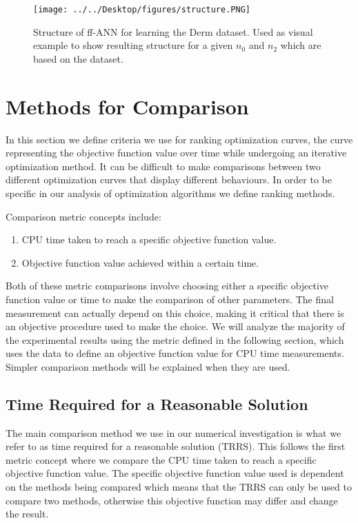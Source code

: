 \documentclass[letterpaper,12pt,titlepage,oneside,final]{book}
\begin{document}
	
	\begin{figure}[h]
		\centering
		\texttt{[image: ../../Desktop/figures/structure.PNG]}
		\caption{Structure of ff-ANN for learning the Derm dataset. Used as visual example to show resulting structure for a given $n_{0}$ and $n_{2}$ which are based on the dataset.}
		\label{figure:structure}
	\end{figure}

	
	\section{Methods for Comparison}
	
	In this section we define criteria we use for ranking optimization curves, the curve representing the objective function value over time while undergoing an iterative optimization method. It can be difficult to make comparisons between two different optimization curves that display different behaviours. In order to be specific in our analysis of optimization algorithms we define ranking methods. 
	
	Comparison metric concepts include:
	\begin{enumerate}
		\item CPU time taken to reach a specific objective function value.
		\item Objective function value achieved within a certain time.
	\end{enumerate}
	
	Both of these metric comparisons involve choosing either a specific objective function value or time to make the comparison of other parameters. The final measurement can actually depend on this choice, making it critical that there is an objective procedure used to make the choice. We will analyze the majority of the experimental results using the metric defined in the following section, which uses the data to define an objective function value for CPU time measurements. Simpler comparison methods will be explained when they are used.
	
	\subsection{Time Required for a Reasonable Solution}
	
	The main comparison method we use in our numerical investigation is what we refer to as time required for a reasonable solution (TRRS). This follows the first metric concept where we compare the CPU time taken to reach a specific objective function value. The specific objective function value used is dependent on the methods being compared which means that the TRRS can only be used to compare two methods, otherwise this objective function may differ and change the result. 
	
\end{document}
